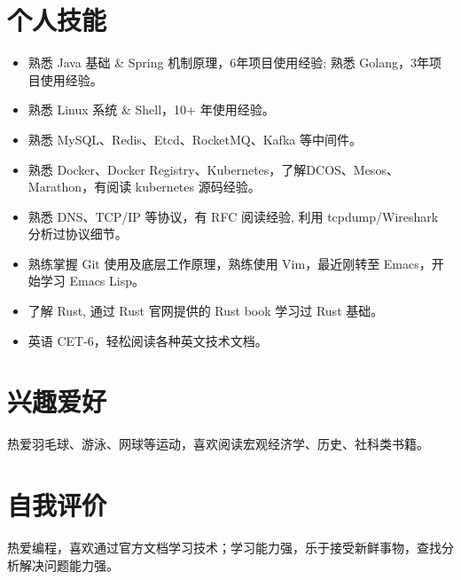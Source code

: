 \documentclass[paper=a4,fontsize=11pt]{scrartcl} %
\newcommand{\Section}[1]{\section*{ #1 }}          %
\begin{document}
\begin{CJK}{UTF8}{gbsn}
\Section{个人技能}

\begin{itemize}
\item 熟悉 Java 基础 \& Spring 机制原理，6年项目使用经验; 熟悉 Golang，3年项目使用经验。
\item 熟悉 Linux 系统 \& Shell，10+ 年使用经验。
\item 熟悉 MySQL、Redis、Etcd、RocketMQ、Kafka 等中间件。
\item 熟悉 Docker、Docker Registry、Kubernetes，了解DCOS、Mesos、Marathon，有阅读 kubernetes 源码经验。
\item 熟悉 DNS、TCP/IP 等协议，有 RFC 阅读经验, 利用 tcpdump/Wireshark 分析过协议细节。
\item 熟练掌握 Git 使用及底层工作原理，熟练使用 Vim，最近刚转至 Emacs，开始学习 Emacs Lisp。
\item 了解 Rust, 通过 Rust 官网提供的 Rust book 学习过 Rust 基础。
\item 英语 CET-6，轻松阅读各种英文技术文档。
\end{itemize}

\Section{兴趣爱好}
热爱羽毛球、游泳、网球等运动，喜欢阅读宏观经济学、历史、社科类书籍。

\Section{自我评价}
热爱编程，喜欢通过官方文档学习技术；学习能力强，乐于接受新鲜事物，查找分析解决问题能力强。
\end{CJK}     %
\end{document}
